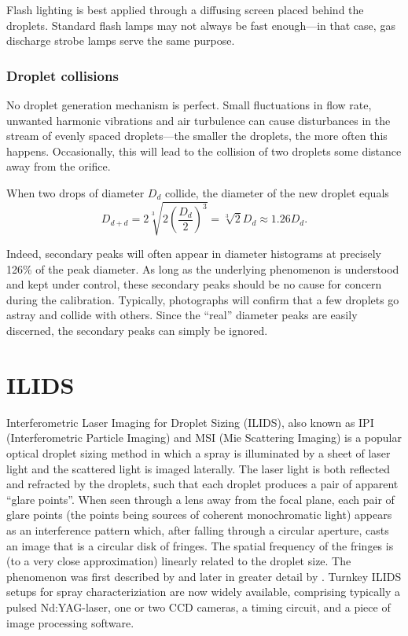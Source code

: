 \documentclass[11.5pt,oneside]{book}
\begin{document}
Flash lighting is best applied through a diffusing screen placed behind the
droplets. Standard flash lamps may not always be fast enough---in that case,
gas discharge strobe lamps serve the same purpose.

\subsection{Droplet collisions}
\label{sec:droplet-collisions}
No droplet generation mechanism is perfect. Small fluctuations in flow rate,
unwanted harmonic vibrations and air turbulence can cause disturbances in the
stream of evenly spaced droplets---the smaller the droplets, the more often
this happens. Occasionally, this will lead to the collision
of two droplets some distance away from the orifice.

When two drops of diameter $D_d$ collide, the diameter of the new droplet equals
\begin{equation}
    D_{d+d} = 2\sqrt[3]{2\left(\frac{D_d}{2}\right)^3} = \sqrt[3]{2} D_d \approx
    1.26 D_d.
\end{equation}

Indeed, secondary peaks will often appear in diameter histograms at precisely 126\% of
the peak diameter. As long as the underlying phenomenon is understood and kept
under control, these secondary peaks should be no cause for concern during the
calibration. Typically, photographs will confirm that a few droplets go astray
and collide with others. Since the ``real'' diameter peaks are easily discerned,
the secondary peaks can simply be ignored.

\chapter[ILIDS]{ILIDS}
Interferometric Laser Imaging for Droplet Sizing (ILIDS), also known
as IPI (Interferometric Particle Imaging) and MSI (Mie Scattering
Imaging) is a popular optical droplet sizing method in which a spray
is illuminated by a sheet of laser light and the scattered light is
imaged laterally. The laser light is both reflected and refracted by the
droplets, such that each droplet produces a pair of apparent ``glare
points''. When seen through a lens away from the focal plane, each pair
of glare points (the points being sources of coherent monochromatic
light) appears as an interference pattern which, after falling through
a circular aperture, casts an image that is a circular disk of fringes.
The spatial frequency of the fringes is (to a very close approximation)
linearly related to the droplet size. The phenomenon was first described
by \citet{Konig86} and later in greater detail by \citet{Glover95}.
Turnkey ILIDS setups for spray characteriziation are now widely
available, comprising typically a pulsed Nd:YAG-laser, one or two CCD
cameras, a timing circuit, and a piece of image processing software.
\end{document}
